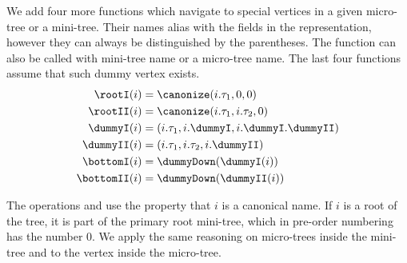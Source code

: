 \begin{algorithm}
\begin{algorithmic}
	 
		 
			\State {}
		\Else {}
			\State {}
		\EndIf
	\Else {}
		\State {}
	\EndIf
\EndFunction
\end{algorithmic}
\end{algorithm}

\begin{algorithm}
\begin{algorithmic}
	 
		\State {}
	 
		\State {}
	\Else {}
		\State {}
	\EndIf
\EndFunction
\end{algorithmic}
\end{algorithm}

We add four more functions which navigate to special vertices in a given micro-tree or a mini-tree.
Their names alias with the fields in the representation, however they can always be distinguished by the parentheses.
The function can also be called with mini-tree name or a micro-tree name.
The last four functions assume that such dummy vertex exists.
\begin{align*}
	\rootI(i) &= \canonize(i.\tau_1, 0, 0) \\
	\rootII(i) &= \canonize(i.\tau_1, i.\tau_2, 0) \\
	\dummyI(i) &= (i.\tau_1, i.\dummyI, i.\dummyI.\dummyII) \\
	\dummyII(i) &= (i.\tau_1, i.\tau_2, i.\dummyII) \\
	\bottomI(i) &= \dummyDown(\dummyI(i)) \\
	\bottomII(i) &= \dummyDown(\dummyII(i))
\end{align*}

\bigbreak

The operations \isRoot{} and \isLeaf{} use the property that $i$ is a canonical name.
If $i$ is a root of the tree, it is part of the primary root mini-tree, which in pre-order numbering has the number $0$.
We apply the same reasoning on micro-trees inside the mini-tree and to the vertex inside the micro-tree.

